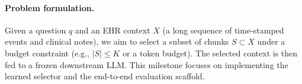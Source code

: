 \paragraph{Problem formulation.}
Given a question $q$ and an EHR context $X$ (a long sequence of time-stamped events and clinical notes), we aim to select a subset of chunks $S \subset X$ under a budget constraint (e.g., $|S|\le K$ or a token budget). The selected context is then fed to a frozen downstream LLM. This milestone focuses on implementing the learned selector and the end-to-end evaluation scaffold.
